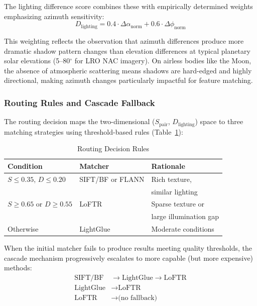 \documentclass[lettersize,journal]{IEEEtran}
\begin{document}
The lighting difference score combines these with empirically determined weights emphasizing azimuth sensitivity:
\begin{equation}
D_{\text{lighting}} = 0.4 \cdot \Delta\alpha_{\text{norm}} + 0.6 \cdot \Delta\phi_{\text{norm}}
\end{equation}

This weighting reflects the observation that azimuth differences produce more dramatic shadow pattern changes than elevation differences at typical planetary solar elevations (5--80$^\circ$ for LRO NAC imagery). On airless bodies like the Moon, the absence of atmospheric scattering means shadows are hard-edged and highly directional, making azimuth changes particularly impactful for feature matching.

\subsubsection{Routing Rules and Cascade Fallback}

The routing decision maps the two-dimensional ($S_{\text{pair}}$, $D_{\text{lighting}}$) space to three matching strategies using threshold-based rules (Table~\ref{tab:routing_rules}):

\begin{table}[htbp]
\caption{Routing Decision Rules}
\label{tab:routing_rules}
\centering
\begin{tabular}{@{}lll@{}}
\toprule
\textbf{Condition} & \textbf{Matcher} & \textbf{Rationale} \\
\midrule
$S \leq 0.35$, $D \leq 0.20$ & SIFT/BF or FLANN & Rich texture, \\
 &  & similar lighting \\
$S \geq 0.65$ or $D \geq 0.55$ & LoFTR & Sparse texture or \\
 &  & large illumination gap \\
Otherwise & LightGlue & Moderate conditions \\
\bottomrule
\end{tabular}
\end{table}

When the initial matcher fails to produce results meeting quality thresholds, the cascade mechanism progressively escalates to more capable (but more expensive) methods:
\begin{align}
\text{SIFT/BF} &\rightarrow \text{LightGlue} \rightarrow \text{LoFTR} \\
\text{LightGlue} &\rightarrow \text{LoFTR} \\
\text{LoFTR} &\rightarrow \text{(no fallback)}
\end{align}
\end{document}
